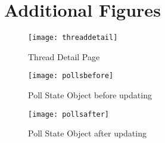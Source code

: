 \chapter{Additional Figures}
\begin{figure}
    \begin{center}
    \texttt{[image: threaddetail]}
    \end{center}
    \caption{Thread Detail Page}
    \label{fig:threaddetail}
\end{figure}

\begin{figure}
    \begin{center}
    \texttt{[image: pollsbefore]}
    \end{center}
    \caption{Poll State Object before updating}
    \label{fig:pollsbefore}
\end{figure}

\begin{figure}
    \begin{center}
    \texttt{[image: pollsafter]}
    \end{center}
    \caption{Poll State Object after updating}
    \label{fig:pollsafter}
\end{figure}

